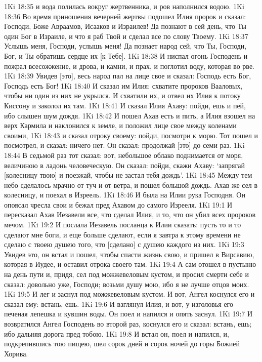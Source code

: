 1Ki 18:35  и вода полилась вокруг жертвенника, и ров наполнился водою.
1Ki 18:36  Во время приношения вечерней жертвы подошел Илия пророк и сказал: Господи, Боже Авраамов, Исааков и Израилев! Да познают в сей день, что Ты один Бог в Израиле, и что я раб Твой и сделал все по слову Твоему.
1Ki 18:37  Услышь меня, Господи, услышь меня! Да познает народ сей, что Ты, Господи, Бог, и Ты обратишь сердце их [к Тебе].
1Ki 18:38  И ниспал огонь Господень и пожрал всесожжение, и дрова, и камни, и прах, и поглотил воду, которая во рве.
1Ki 18:39  Увидев [это], весь народ пал на лице свое и сказал: Господь есть Бог, Господь есть Бог!
1Ki 18:40  И сказал им Илия: схватите пророков Вааловых, чтобы ни один из них не укрылся. И схватили их, и отвел их Илия к потоку Киссону и заколол их там.
1Ki 18:41  И сказал Илия Ахаву: пойди, ешь и пей, ибо слышен шум дождя.
1Ki 18:42  И пошел Ахав есть и пить, а Илия взошел на верх Кармила и наклонился к земле, и положил лице свое между коленами своими,
1Ki 18:43  и сказал отроку своему: пойди, посмотри к морю. Тот пошел и посмотрел, и сказал: ничего нет. Он сказал: продолжай [это] до семи раз.
1Ki 18:44  В седьмой раз тот сказал: вот, небольшое облако поднимается от моря, величиною в ладонь человеческую. Он сказал: пойди, скажи Ахаву: `запрягай [колесницу твою] и поезжай, чтобы не застал тебя дождь'.
1Ki 18:45  Между тем небо сделалось мрачно от туч и от ветра, и пошел большой дождь. Ахав же сел в колесницу, и поехал в Изреель.
1Ki 18:46  И была на Илии рука Господня. Он опоясал чресла свои и бежал пред Ахавом до самого Изрееля.
1Ki 19:1  И пересказал Ахав Иезавели все, что сделал Илия, и то, что он убил всех пророков мечом.
1Ki 19:2  И послала Иезавель посланца к Илии сказать: пусть то и то сделают мне боги, и еще больше сделают, если я завтра к этому времени не сделаю с твоею душею того, что [сделано] с душею каждого из них.
1Ki 19:3  Увидев это, он встал и пошел, чтобы спасти жизнь свою, и пришел в Вирсавию, которая в Иудее, и оставил отрока своего там.
1Ki 19:4  А сам отошел в пустыню на день пути и, придя, сел под можжевеловым кустом, и просил смерти себе и сказал: довольно уже, Господи; возьми душу мою, ибо я не лучше отцов моих.
1Ki 19:5  И лег и заснул под можжевеловым кустом. И вот, Ангел коснулся его и сказал ему: встань, ешь.
1Ki 19:6  И взглянул Илия, и вот, у изголовья его печеная лепешка и кувшин воды. Он поел и напился и опять заснул.
1Ki 19:7  И возвратился Ангел Господень во второй раз, коснулся его и сказал: встань, ешь; ибо дальняя дорога пред тобою.
1Ki 19:8  И встал он, поел и напился, и, подкрепившись тою пищею, шел сорок дней и сорок ночей до горы Божией Хорива.
